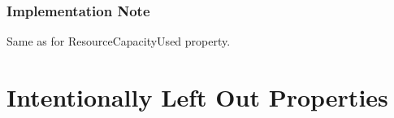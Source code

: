 \subsubsection*{Implementation Note}

Same as for ResourceCapacityUsed property.



%
%
%
%
%
%
%
%
%
%
%



\section{Intentionally Left Out Properties}

